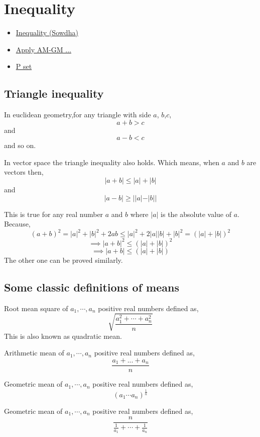 \chapter{Inequality}%
\begin{linkb}
   \begin{itemize}
        \item \href{https://www.youtube.com/watch?v=H7UwnAGZY0A}{Inequality (Sowdha)} 
        \item \href{https://drive.google.com/file/d/1Vm117lBF5yuZrRGMjmMS-HccPmknl5uK/view?usp=sharing}{Apply AM-GM ...}
        \item \href{https://drive.google.com/file/d/12GWPOw5_9c4-KD5PNCdJSS0i3lAORI5s/view}{P set}
   \end{itemize}
\end{linkb}
\section{Triangle inequality}
 In euclidean geometry,for any triangle with side $a$, $b$,$c$,
 \[a+b >c\] 
and \[a-b<c\] and so on.

In vector space the triangle inequality also holds. Which means, when $a$ and $b $ are vectors then,
\[|a+b| \le |a|+|b|\]
 and \[|a-b|\ge ||a|-|b||\]
 
  This is true for any real number $a$ and $b$ where $|a|$ is the absolute value of $a$. Because, 
  \[ (a+b)^2 = |a|^2+ |b|^2 + 2ab \le |a|^2 + 2|a||b| + |b|^2 = (|a|+|b|)^2  \]
  \[\implies |a+b|^2 \le  (|a|+|b|)^2 \]
  \[\implies |a+b| \le  (|a|+|b|) \]
  The other one can be proved similarly. 
 
 
    \section{Some classic definitions of means}
    \begin{definition}
    Root mean square of $a_1, \cdots ,a_n$ positive real numbers defined as,
    \[\sqrt {\frac{a_1^2+ \cdots +a_n^2}{n}}\]
    This is also known as quadratic mean.
    \end{definition}
\begin{definition}
Arithmetic mean of $a_1, \cdots ,a_n$ positive real numbers defined as, 
\[ \frac{a_1+...+a_n}{n}\]
\end{definition}
\begin{definition}
Geometric mean of $a_1, \cdots  ,a_n$ positive real numbers defined as, 
   \[ (a_1 \cdots a_n)^{\frac{1}{n}} \]
\end{definition}
\begin{definition}
Geometric mean of $a_1, \cdots  ,a_n$ positive real numbers defined as,
\[\frac{n}{\frac{1}{a_1}+\cdots+ \frac{1}{a_n}}\]
\end{definition}
  
